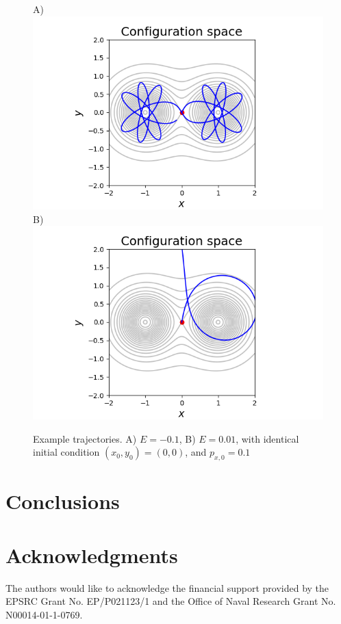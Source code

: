 \documentclass[10pt,aps,onecolumn,superscriptaddress]{revtex4-2}
\begin{document}
\begin{figure}
    \centering
    A)\includegraphics{traj_type2.png}
    B)\includegraphics{traj_escapping.png}
    \caption{Example trajectories. A) $E = -0.1$, B) $E=0.01$, with identical initial condition $(x_0, y_0) = (0,0)$, and $p_{x,0} = 0.1$}
    \label{fig:my_label}
\end{figure}

\section{Conclusions}
\label{sec:conclusion}

\section*{Acknowledgments}
The authors would like to acknowledge the financial support provided by the EPSRC Grant No. EP/P021123/1 and the Office of Naval Research Grant No. N00014-01-1-0769.


\end{document}
